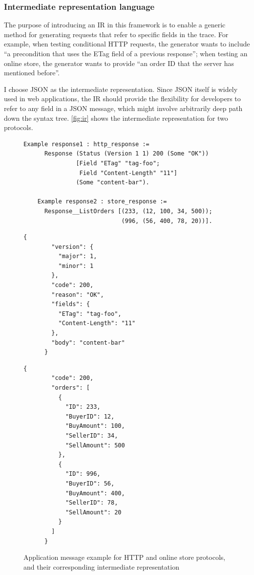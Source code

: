\documentclass{article}
\theoremstyle{definition}
\begin{document}
\subsubsection{Intermediate representation language}
The purpose of introducing an IR in this framework is to enable a generic method
for generating requests that refer to specific fields in the trace.  For
example, when testing conditional HTTP requests, the generator wants to include
``a precondition that uses the ETag field of a previous response''; when testing
an online store, the generator wants to provide ``an order ID that the server
has mentioned before''.

I choose JSON as the intermediate representation.  Since JSON itself is widely
used in web applications, the IR should provide the flexibility for developers
to refer to any field in a JSON message, which might involve arbitrarily deep
path down the syntax tree.  \autoref{fig:ir} shows the intermediate
representation for two protocols.

\begin{figure}
  \begin{lstlisting}[style=customcoq]
    Example response1 : http_response :=
      Response (Status (Version 1 1) 200 (Some "OK"))
               [Field "ETag" "tag-foo";
                Field "Content-Length" "11"]
               (Some "content-bar").

    Example response2 : store_response :=
      Response__ListOrders [(233, (12, 100, 34, 500));
                            (996, (56, 400, 78, 20))].
  \end{lstlisting}
  \begin{minipage}[t]{.4\textwidth}
    \begin{lstlisting}[style=json]
      {
        "version": {
          "major": 1,
          "minor": 1
        },
        "code": 200,
        "reason": "OK",
        "fields": {
          "ETag": "tag-foo",
          "Content-Length": "11"
        },
        "body": "content-bar"
      }
    \end{lstlisting}
  \end{minipage}%
  \begin{minipage}[t]{.4\textwidth}
    \begin{lstlisting}[style=json]
      {
        "code": 200,
        "orders": [
          {
            "ID": 233,
            "BuyerID": 12,
            "BuyAmount": 100,
            "SellerID": 34,
            "SellAmount": 500
          },
          {
            "ID": 996,
            "BuyerID": 56,
            "BuyAmount": 400,
            "SellerID": 78,
            "SellAmount": 20
          }
        ]
      }
    \end{lstlisting}
  \end{minipage}
  \caption{Application message example for HTTP and online store protocols, and
    their corresponding intermediate representation}
  \label{fig:ir}
\end{figure}
\end{document}
